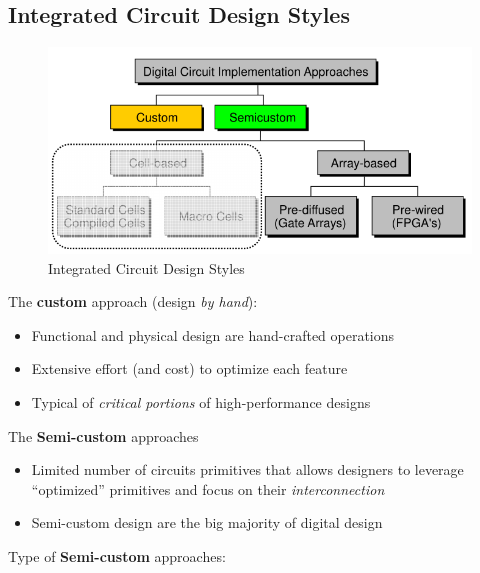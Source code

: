 \subsection{Integrated Circuit Design Styles}
\begin{figure}[H]
	\centering
	\includegraphics[height=90 mm]{./Cap1/Images/Image01.png}
	\caption[Optional caption]{Integrated Circuit Design Styles}
	\label{fig:ICDS}
\end{figure}
The \textbf{custom} approach (design \textit{by hand}):
\begin{itemize}
\item Functional and physical design are hand-crafted operations
\item Extensive effort (and cost) to optimize each feature
\item Typical of \textit{critical portions} of high-performance designs
\end{itemize}
The \textbf{Semi-custom} approaches
\begin{itemize}
\item Limited number of circuits primitives that allows designers to leverage “optimized” primitives and focus on their \textit{interconnection}
\item Semi-custom design are the big majority of digital design
\end{itemize}
Type of \textbf{Semi-custom} approaches:
